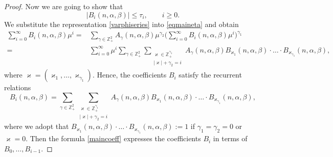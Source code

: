 \documentclass[10pt, a4paper]{article}
\theoremstyle{plain}
\theoremstyle{definition}
\numberwithin{equation}{section}
\def\a{\alpha}
\def\b{\beta}
\begin{document}
\begin{proof}
Now we are going to show that
\begin{equation}\label{4.24}
|B_i(n,\a,\b)|\leqslant \tau_i,\qquad i\geqslant0.
\end{equation}
We substitute the representation \eqref{varphiseries} into \eqref{eqmaineta} and obtain
\begin{align*}
\sum\limits_{i=0}^\infty B_i(n,\a,\b)\mu^i=&\sum\limits_{\gamma\in\mathds{Z}_+^2}
A_\gamma(n,\a,\b)\mu^{\gamma_2}
\bigg(\sum\limits_{i=0}^\infty B_i(n,\a,\b)\mu^i\bigg)^{\gamma_1}
\\
=&\sum\limits_{i=0}^\infty\mu^i\sum\limits_{\gamma\in\mathds{Z}_+^2}
\sum\limits_{\substack{\varkappa\in\mathds{Z}_+^{\gamma_1} \\ |\varkappa|+\gamma_2=i}}
A_\gamma(n,\a,\b)B_{\varkappa_1}(n,\a,\b)\cdot\ldots\cdot B_{\varkappa_{\gamma_1}}(n,\a,\b),
\end{align*}
where $\varkappa=(\varkappa_1, \dots, \varkappa_{\gamma_1})$. Hence, the coefficients
$B_i$ satisfy the recurrent relations
\begin{equation}\label{maincoeff}
B_i(n,\a,\b)=\sum\limits_{\gamma\in\mathds{Z}_+^2}
\sum\limits_{\substack{\varkappa\in\mathds{Z}_+^{\gamma_1} \\ |\varkappa|+\gamma_2=i}}
A_\gamma(n,\a,\b)B_{\varkappa_1}(n,\a,\b)\cdot\ldots\cdot B_{\varkappa_{\gamma_1}}(n,\a,\b),
\end{equation}
where we adopt that $B_{\varkappa_1}(n,\a,\b)\cdot\dots\cdot B_{\varkappa_{\gamma_1}}(n,\a,\b):=1$
if $\gamma_1=\gamma_2=0$ or $\varkappa=0$.
Then the formula \eqref{maincoeff} expresses the coefficients $B_i$ in terms of $B_0, \dots, B_{i-1}$.


\end{proof}
\end{document}
